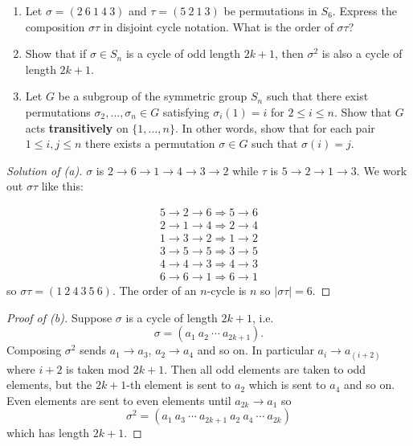 \begin{prob}[2 Exam 2019]
    \begin{enumerate}[label=\alph*)]
        \item Let $\sigma = (2 \ 6 \ 1 \ 4 \ 3)$ and 
            $\tau = (5 \ 2 \ 1 \ 3)$ be permutations in $S_6$.
            Express the composition $\sigma\tau$ in disjoint 
            cycle notation.
            What is the order of $\sigma\tau$?
        \item Show that if $\sigma \in S_n$ is a cycle of odd length 
            $2k+1$, then $\sigma^2$ is also a cycle of length 
            $2k+1$.
        \item Let $G$ be a subgroup of the symmetric group 
            $S_n$ such that there exist permutations 
            $\sigma_2,\ldots,\sigma_n \in G$ satisfying 
            $\sigma_i(1) = i$ for $2 \leq i \leq n$. Show that 
            $G$ acts \textbf{transitively} on $\{1,\ldots,n\}$. In 
            other words, show that for each pair $1 \leq i,j \leq n$
            there exists a permutation $\sigma \in G$ such that 
            $\sigma(i) = j$.
    \end{enumerate}
\end{prob}
\begin{proof}[Solution of (a)]
    $\sigma$ is $2 \to 6 \to 1 \to 4 \to 3 \to 2$ while 
    $\tau$ is $5 \to 2 \to 1 \to 3$. 
    We work out $\sigma\tau$ like this: 

    \begin{align*}
        5 \to 2 \to 6 \Rightarrow 5 \to 6 \\ 
        2 \to 1 \to 4 \Rightarrow 2 \to 4 \\ 
        1 \to 3 \to 2 \Rightarrow 1 \to 2 \\ 
        3 \to 5 \to 5 \Rightarrow 3 \to 5 \\ 
        4 \to 4 \to 3 \Rightarrow 4 \to 3 \\ 
        6 \to 6 \to 1 \Rightarrow 6 \to 1
    \end{align*}
    so $\sigma\tau = (1 \ 2 \ 4 \ 3 \ 5 \ 6)$. 
    The order of an $n$-cycle is $n$ so $|\sigma\tau| = 6$.
\end{proof}
\begin{proof}[Proof of (b)]
    Suppose $\sigma$ is a cycle of length $2k+1$, i.e. 
    \[
        \sigma = (a_1 \ a_2 \ \cdots \ a_{2k+1}).
    \]
    Composing $\sigma^2$ sends $a_1 \to a_3$, $a_2 \to a_4$ and so 
    on. In particular $a_{i} \to a_{(i + 2)}$ where $i+2$ is 
    taken mod $2k+1$. Then all odd elements are taken 
    to odd elements, but the $2k+1$-th element is sent 
    to $a_2$ which is sent to $a_4$ and so on. Even elements 
    are sent to even elements until $a_{2k} \to a_1$ so 
    \[
        \sigma^2 = (a_1 \ a_3 \ \cdots \ a_{2k+1} \ a_2 \ 
        a_4 \ \cdots \ a_{2k})
    \]
    which has length $2k+1$.
\end{proof}
